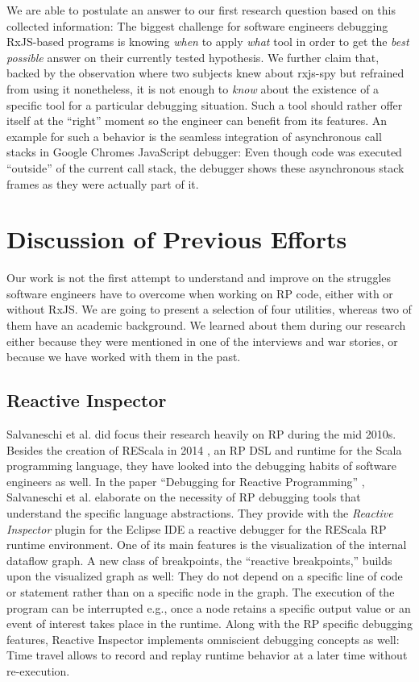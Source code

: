 \documentclass[12pt,a4paper]{article}
\begin{document}
We are able to postulate an answer to our first research question based on this collected information: The biggest challenge for software engineers debugging RxJS-based programs is knowing \emph{when} to apply \emph{what} tool in order to get the \emph{best possible} answer on their currently tested hypothesis. We further claim that, backed by the observation where two subjects knew about rxjs-spy but refrained from using it nonetheless, it is not enough to \emph{know} about the existence of a specific tool for a particular debugging situation. Such a tool should rather offer itself at the ``right'' moment so the engineer can benefit from its features. An example for such a behavior is the seamless integration of asynchronous call stacks in Google Chromes JavaScript debugger\cite{chromeasync}: Even though code was executed ``outside'' of the current call stack, the debugger shows these asynchronous stack frames as they were actually part of it.


\section{Discussion of Previous Efforts}
\label{sec:discussion}

Our work is not the first attempt to understand and improve on the struggles software engineers have to overcome when working on RP code, either with or without RxJS. We are going to present a selection of four utilities, whereas two of them have an academic background. We learned about them during our research either because they were mentioned in one of the interviews and war stories, or because we have worked with them in the past.

\subsection{Reactive Inspector}

Salvaneschi et al. did focus their research heavily on RP during the mid 2010s. Besides the creation of REScala in 2014 \cite{10.1145/2577080.2577083}, an RP DSL and runtime for the Scala programming language, they have looked into the debugging habits of software engineers as well. In the paper ``Debugging for Reactive Programming'' \cite{10.1145/2884781.2884815}, Salvaneschi et al. elaborate on the necessity of RP debugging tools that understand the specific language abstractions. They provide with the \emph{Reactive Inspector} plugin for the Eclipse IDE a reactive debugger for the REScala RP runtime environment. One of its main features is the visualization of the internal dataflow graph. A new class of  breakpoints, the ``reactive breakpoints,'' builds upon the visualized graph as well: They do not depend on a specific line of code or statement rather than on a specific node in the graph. The execution of the program can be interrupted e.g., once a node retains a specific output value or an event of interest takes place in the runtime. Along with the RP specific debugging features, Reactive Inspector implements omniscient debugging concepts as well: Time travel allows to record and replay runtime behavior at a later time without re-execution.
\end{document}
